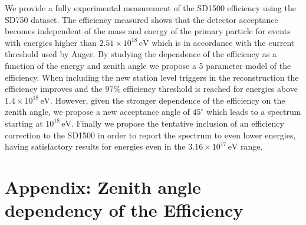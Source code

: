 \documentclass[12pt,a4paper]{article}
\newcommand{\eV}{\, \mathrm{eV}}
\begin{document}
We provide a fully experimental measurement of the SD1500 efficiency using the SD750 dataset. The efficiency measured shows that the detector acceptance becomes independent of the mass and energy of the primary particle for events with energies higher than $2.51\times10^{18}\eV$ which is in accordance with the current threshold used by Auger. By studying the dependence of the efficiency as a function of the energy and zenith angle we propose a 5 parameter model of the efficiency.
When including the new station level triggers in the reconstruction the efficiency improves and the $97\%$ efficiency threshold is reached for energies above $1.4\times10^{18}\eV$. However, given the stronger dependence of the efficiency on the zenith angle, we propose a new acceptance angle of $45^{\circ}$ which leads to a spectrum starting at $10^{18}\eV$.
Finally we propose the tentative inclusion of an efficiency correction to the SD1500 in order to report the spectrum to even lower energies, having satisfactory results for energies even in the $3.16\times10^{17}\eV$ range.

\pagebreak

\section*{Appendix: Zenith angle dependency of the Efficiency}
\end{document}
